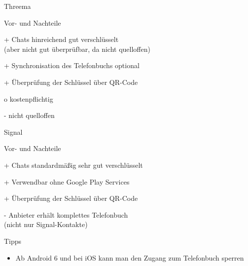 \begin{frame}{Threema}
  \begin{blex}{Vor- und Nachteile}
    \item[+] Chats hinreichend gut verschlüsselt\\(aber nicht gut überprüfbar, da nicht quelloffen)
    \item[+] Synchronisation des Telefonbuchs optional
    \item[+] Überprüfung der Schlüssel über QR-Code
    \item[o] kostenpflichtig
    \item[-] nicht quelloffen
  \end{blex}
\end{frame}

\begin{frame}{Signal}
  \begin{blex}{Vor- und Nachteile}
    \item[+] Chats standardmäßig sehr gut verschlüsselt
    \item[+] Verwendbar ohne Google Play Services %
    \item[+] Überprüfung der Schlüssel über QR-Code
    \item[-] Anbieter erhält komplettes Telefonbuch\\ (nicht nur Signal-Kontakte)
  \end{blex}
  \begin{block}{Tipps}
    \begin{itemize}
      \item Ab Android 6 und bei iOS kann man den Zugang zum Telefonbuch sperren
    \end{itemize}
  \end{block}
\end{frame}

